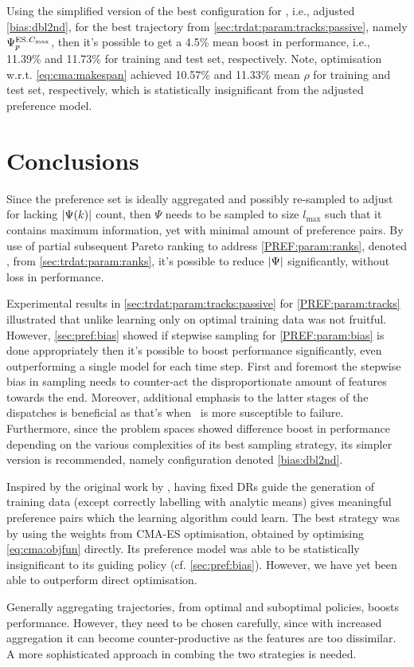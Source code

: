 Using the simplified version of the best configuration for , 
i.e., adjusted \ref{bias:dbl2nd}, for the best  trajectory from  
\cref{sec:trdat:param:tracks:passive}, namely $\Psi^{\text{ES}.{C_{\max}}}_p$, then it's 
possible to get a 4.5\% mean boost in performance, i.e., 11.39\% and 11.73\% 
for training and test set, respectively. 
Note, optimisation w.r.t. \cref{eq:cma:makespan} achieved 10.57\% 
and 11.33\% mean $\rho$ for training and test set, respectively, which is 
statistically insignificant from the adjusted preference model.

\clearpage
\section{Conclusions}
Since the preference set is ideally aggregated and possibly re-sampled 
to adjust for lacking $\lvert\Psi(k)\rvert$ count, then $\Psi$ needs to be sampled to 
size $l_{\max}$ such that it contains maximum information, yet with minimal 
amount of preference pairs. 
By use of partial subsequent Pareto ranking to address \ref{PREF:param:ranks}, 
denoted , from \cref{sec:trdat:param:ranks}, it's possible to reduce 
$\lvert\Psi\rvert$ significantly, without loss in performance. 

Experimental results in \cref{sec:trdat:param:tracks:passive} for 
\ref{PREF:param:tracks} illustrated that unlike 
\citet{Siggi10,Malik08,Russell09} learning only on optimal training data was 
not fruitful. 
However, \cref{sec:pref:bias} showed if stepwise sampling for 
\ref{PREF:param:bias} is done appropriately then it's possible to boost 
performance significantly, even outperforming a single model for each time step.
First and foremost the stepwise bias in sampling needs to counter-act the 
disproportionate amount of features towards the end. 
Moreover, additional emphasis to the latter stages of the dispatches is 
beneficial as that's when \JSP\ is more susceptible to failure. 
Furthermore, since the problem spaces showed difference boost in performance 
depending on the various complexities of its best sampling strategy, its 
simpler version is recommended, namely configuration denoted \ref{bias:dbl2nd}.

Inspired by the original work by \cite{Siggi05}, having fixed DRs guide the 
generation of training data (except correctly labelling with analytic means) 
gives meaningful preference pairs which the learning algorithm could learn. 
The best strategy was by using the weights from CMA-ES optimisation, obtained 
by optimising \cref{eq:cma:objfun} directly. 
Its preference model was able to be statistically insignificant to its guiding 
policy (cf. \cref{sec:pref:bias}). 
However, we have yet been able to outperform direct optimisation. 

Generally aggregating trajectories, from optimal and suboptimal policies, 
boosts performance. However, they need to be chosen carefully, since
with increased aggregation it can become counter-productive as the features are 
too dissimilar. 
A more sophisticated approach in combing the two strategies is needed. 


